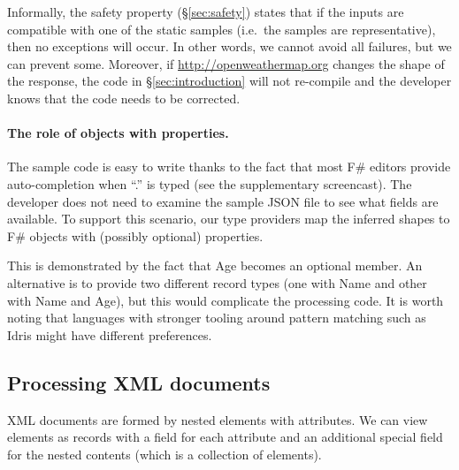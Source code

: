 \documentclass[10pt,preprint,clearpagebib]{sigplanconf}
\newcommand{\ident}[1]{\textnormal{\sffamily #1}}
\begin{document}
Informally, the safety property (\S\ref{sec:safety}) states that if the inputs are compatible
with one of the static samples (i.e.~the samples are representative), then no exceptions will 
occur. In other words, we cannot avoid all failures, but we can prevent some. Moreover, if
\url{http://openweathermap.org} changes the shape of the response, the code in \S\ref{sec:introduction}
will not re-compile and the developer knows that the code needs to be corrected. 

\paragraph{The role of objects with properties.}
The sample code is easy to write thanks to the fact that most F\# editors provide auto-completion
when ``.'' is typed (see the supplementary screencast). The developer does not need to examine the 
sample JSON file to see what fields are available. To support this scenario, our type providers 
map the inferred shapes to F\# objects with (possibly optional) properties.

This is demonstrated by the fact that \ident{Age} becomes an optional member.
An alternative is to provide two different record types (one with \ident{Name} and other with 
\ident{Name} and \ident{Age}), but this would complicate the processing code.
It is worth noting that languages with stronger tooling around pattern matching
such as Idris \cite{idris-tools} might have different preferences.


\subsection{Processing XML documents}
\label{sec:providers-xml}

XML documents are formed by nested elements with attributes. We can view elements as records with 
a field for each attribute and an additional special field for the nested contents (which is a 
collection of elements).
\end{document}
